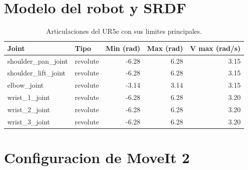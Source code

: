 \documentclass[11pt,a4paper]{article}
\begin{document}
\section{Modelo del robot y SRDF}
\label{sec:modelo}



\begin{table}[H]
  \centering
  \caption{Articulaciones del UR5e con sus limites principales.}
  \label{tab:joints}
  \begin{tabularx}{\linewidth}{lXrrr}
    \toprule
    Joint & Tipo & Min (rad) & Max (rad) & V max (rad/s) \\
    \midrule
    shoulder\_pan\_joint    & revolute & -6.28 & 6.28 & 3.15 \\
    shoulder\_lift\_joint   & revolute & -6.28 & 6.28 & 3.15 \\
    elbow\_joint            & revolute & -3.14 & 3.14 & 3.15 \\
    wrist\_1\_joint         & revolute & -6.28 & 6.28 & 3.20 \\
    wrist\_2\_joint         & revolute & -6.28 & 6.28 & 3.20 \\
    wrist\_3\_joint         & revolute & -6.28 & 6.28 & 3.20 \\
    \bottomrule
  \end{tabularx}
\end{table}

\section{Configuracion de MoveIt 2}
\label{sec:moveit}

\end{document}

